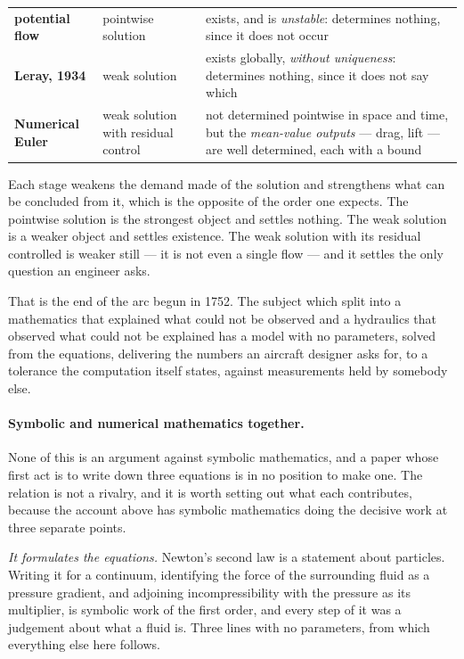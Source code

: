 \documentclass[11pt]{article}
\begin{document}
\begin{center}\small
\begin{tabular}{@{}llp{}@{}}
\hline
\textbf{potential flow} & pointwise solution & exists, and is \emph{unstable}: determines nothing,
since it does not occur \\[3pt]
\textbf{Leray, 1934} & weak solution & exists globally, \emph{without uniqueness}: determines
nothing, since it does not say which \\[3pt]
\textbf{Numerical Euler} & weak solution with residual control & not determined pointwise in space
and time, but the \emph{mean-value outputs} --- drag, lift --- are well determined, each with a
bound \\
\hline
\end{tabular}
\end{center}

\noindent Each stage weakens the demand made of the solution and strengthens what can be concluded
from it, which is the opposite of the order one expects. The pointwise solution is the strongest
object and settles nothing. The weak solution is a weaker object and settles existence. The weak
solution with its residual controlled is weaker still --- it is not even a single flow --- and it
settles the only question an engineer asks.

That is the end of the arc begun in 1752. The subject which split into a mathematics that explained
what could not be observed and a hydraulics that observed what could not be explained has a model
with no parameters, solved from the equations, delivering the numbers an aircraft designer asks for,
to a tolerance the computation itself states, against measurements held by somebody else.

\paragraph{Symbolic and numerical mathematics together.} None of this is an argument against symbolic
mathematics, and a paper whose first act is to write down three equations is in no position to make
one. The relation is not a rivalry, and it is worth setting out what each contributes, because the
account above has symbolic mathematics doing the decisive work at three separate points.

\emph{It formulates the equations.} Newton's second law is a statement about particles. Writing it
for a continuum, identifying the force of the surrounding fluid as a pressure gradient, and adjoining
incompressibility with the pressure as its multiplier, is symbolic work of the first order, and every
step of it was a judgement about what a fluid is. Three lines with no parameters, from which
everything else here follows.
\end{document}
